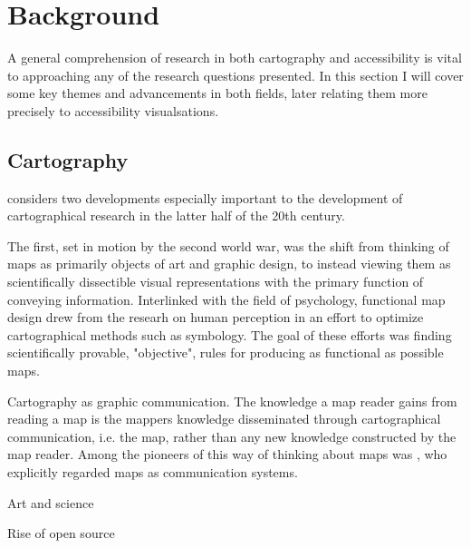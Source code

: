 \documentclass[12pt]{article}
\begin{document}
\section{Background}
A general comprehension of research in both cartography and accessibility is
vital to approaching any of the research questions presented.
In this section I will cover some key themes and advancements in both fields,
later relating them more precisely to accessibility visualsations.


\subsection{Cartography}

\textcite{mac2004} considers two developments especially important
to the development of cartographical research in the latter half of the 20th century.

The first, set in motion by the second world war, was
the shift from thinking of maps as primarily objects of art and graphic design,
to instead viewing them as scientifically dissectible visual representations
with the primary function of conveying information.
Interlinked with the field of psychology,
functional map design drew from the researh on human perception
in an effort to optimize cartographical methods such as symbology.
The goal of these efforts was finding scientifically provable, "objective", rules
for producing as functional as possible maps.

Cartography as graphic communication.
The knowledge a map reader gains from reading a map is
the mappers knowledge disseminated through cartographical communication, i.e. the map,
rather than any new knowledge constructed by the map reader.
Among the pioneers of this way of thinking about maps was \textcite{kol1969},
who explicitly regarded maps as communication systems.

Art and science \parencite{mac2004, tyn1992}  %


Rise of open source \textcite{pet2015}
\end{document}
